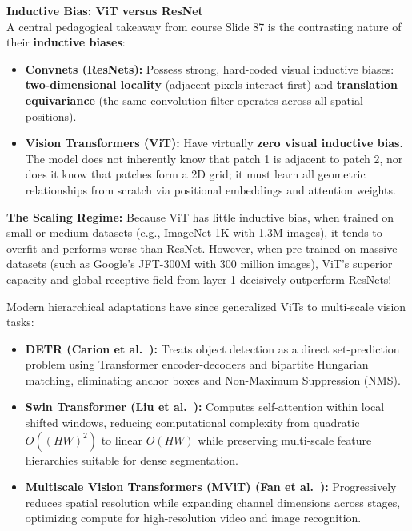 \begin{keywordbox}
\textbf{Inductive Bias: ViT versus ResNet} \\
A central pedagogical takeaway from course Slide 87 is the contrasting nature of their \textbf{inductive biases}:
\begin{itemize}[leftmargin=*]
    \item \textbf{Convnets (ResNets):} Possess strong, hard-coded visual inductive biases: \textbf{two-dimensional locality} (adjacent pixels interact first) and \textbf{translation equivariance} (the same convolution filter operates across all spatial positions).
    \item \textbf{Vision Transformers (ViT):} Have virtually \textbf{zero visual inductive bias}. The model does not inherently know that patch 1 is adjacent to patch 2, nor does it know that patches form a 2D grid; it must learn all geometric relationships from scratch via positional embeddings and attention weights.
\end{itemize}
\textbf{The Scaling Regime:}
Because ViT has little inductive bias, when trained on small or medium datasets (e.g., ImageNet-1K with 1.3M images), it tends to overfit and performs worse than ResNet. However, when pre-trained on massive datasets (such as Google's JFT-300M with 300 million images), ViT's superior capacity and global receptive field from layer 1 decisively outperform ResNets!
\end{keywordbox}

Modern hierarchical adaptations have since generalized ViTs to multi-scale vision tasks:
\begin{itemize}[leftmargin=*]
    \item \textbf{DETR (Carion et al.~\cite{carion2020end}):} Treats object detection as a direct set-prediction problem using Transformer encoder-decoders and bipartite Hungarian matching, eliminating anchor boxes and Non-Maximum Suppression (NMS).
    \item \textbf{Swin Transformer (Liu et al.~\cite{liu2021swin}):} Computes self-attention within local shifted windows, reducing computational complexity from quadratic $O({(HW)}^2)$ to linear $O(HW)$ while preserving multi-scale feature hierarchies suitable for dense segmentation.
    \item \textbf{Multiscale Vision Transformers (MViT) (Fan et al.~\cite{fan2021multiscale}):} Progressively reduces spatial resolution while expanding channel dimensions across stages, optimizing compute for high-resolution video and image recognition.
\end{itemize}


